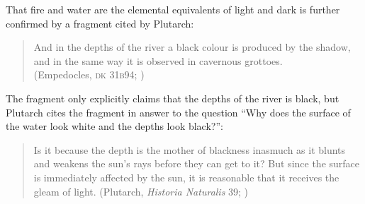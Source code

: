 That fire and water are the elemental equivalents of light and dark is further confirmed by a fragment cited by Plutarch:
\begin{verse}
    And in the depths of the river a black colour is produced by the shadow,\\
    and in the same way it is observed in cavernous grottoes.\\
    (Empedocles, \textsc{dk} 31\textsc{b}94; \citealt[105 261]{Inwood:2001ve})
\end{verse}
The fragment only explicitly claims that the depths of the river is black, but Plutarch cites the fragment in answer to the question ``Why does the surface of the water look white and the depths look black?'':
\begin{quote}
    Is it because the depth is the mother of blackness inasmuch as it blunts and weakens the sun's rays before they can get to it? But since the surface is immediately affected by the sun, it is reasonable that it receives the gleam of light.  (Plutarch, \emph{Historia Naturalis} 39; \citealt[\textsc{ctxt}-87 137--138]{Inwood:2001ve})
\end{quote}
